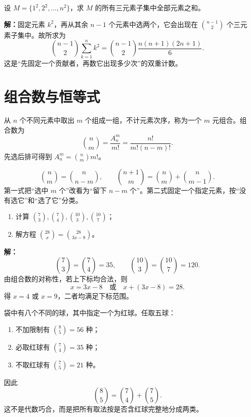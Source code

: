 \begin{examplebox}
  设 $M=\{1^2,2^2,\ldots,n^2\}$，求 $M$ 的所有三元素子集中全部元素之和。

  \textbf{解：}固定元素 $k^2$，再从其余 $n-1$ 个元素中选两个，它会出现在 $\binom{n-1}{2}$ 个三元素子集中。故所求为
  \[
    \binom{n-1}{2}\sum_{k=1}^n k^2
    =\binom{n-1}{2}\frac{n(n+1)(2n+1)}6.
  \]
  这是“先固定一个贡献者，再数它出现多少次”的双重计数。
\end{examplebox}

\section{组合数与恒等式}

\begin{definitionbox}[组合与组合数]
  从 $n$ 个不同元素中取出 $m$ 个组成一组，不计元素次序，称为一个 $m$ 元组合。组合数为
  \[
    \binom nm=\frac{A_n^m}{m!}
    =\frac{n!}{m!(n-m)!}.
  \]
  先选后排可得到 $A_n^m=\binom nm m!$。
\end{definitionbox}

\begin{lawbox}[组合数的对称与递推]
  \[
    \binom nm=\binom n{n-m},
    \qquad
    \binom{n+1}m=\binom nm+\binom n{m-1}.
  \]
  第一式把“选中 $m$ 个”改看为“留下 $n-m$ 个”。第二式固定一个指定元素，按“没有选它”和“选了它”分类。
\end{lawbox}

\begin{examplebox}
  \begin{enumerate}
    \item 计算 $\binom73,\binom74,\binom{10}3,\binom{10}7$；
    \item 解方程 $\binom{28}{x}=\binom{28}{3x-8}$。
  \end{enumerate}

  \textbf{解：}
  \[
    \binom73=\binom74=35,
    \qquad
    \binom{10}3=\binom{10}7=120.
  \]
  由组合数的对称性，若上下标均合法，则
  \[
    x=3x-8\quad\text{或}\quad x+(3x-8)=28.
  \]
  得 $x=4$ 或 $x=9$，二者均满足下标范围。
\end{examplebox}

\begin{examplebox}
  袋中有八个不同的球，其中指定一个为红球。任取五球：
  \begin{enumerate}
    \item 不加限制有 $\binom85=56$ 种；
    \item 必取红球有 $\binom74=35$ 种；
    \item 不取红球有 $\binom75=21$ 种。
  \end{enumerate}
  因此
  \[
    \binom85=\binom74+\binom75.
  \]
  这不是代数巧合，而是把所有取法按是否含红球完整地分成两类。
\end{examplebox}

